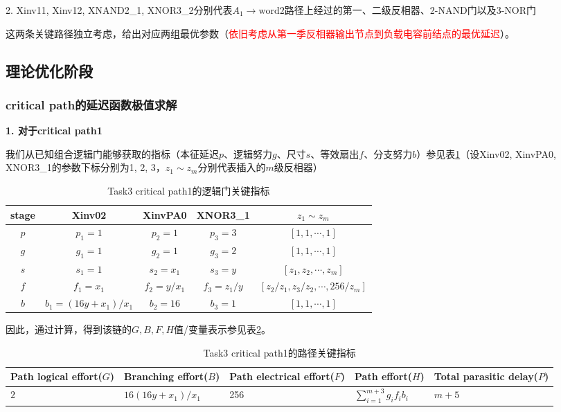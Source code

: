 \documentclass[UTF8,12pt,a4paper]{ctexart}
\begin{document}
2. Xinv11, Xinv12, XNAND2\_1, XNOR3\_2分别代表$A_1 \rightarrow \text{word2}$路径上经过的第一、二级反相器、2-NAND门以及3-NOR门

这两条关键路径独立考虑，给出对应两组最优参数（\textcolor{red}{依旧考虑从第一季反相器输出节点到负载电容前结点的最优延迟}）。

\subsection{理论优化阶段}

\subsubsection{critical path的延迟函数极值求解}

\textbf{1. 对于critical path1}

我们从已知组合逻辑门能够获取的指标（本征延迟$p$、逻辑努力$g$、尺寸$s$、等效扇出$f$、分支努力$b$）参见表\ref{tab:task3_p1_metrics}（设Xinv02, XinvPA0, XNOR3\_1的参数下标分别为1, 2, 3，$z_1 \sim z_m$分别代表插入的$m$级反相器）

\begin{table}[htbp]
    \centering
    \caption{Task3 critical path1的逻辑门关键指标}
    \label{tab:task3_p1_metrics}
    \begin{tabular}{ccccc}
    \toprule
    stage & Xinv02 & XinvPA0 & XNOR3\_1 & $z_1 \sim z_m$ \\
    \midrule
    $p$ & $p_1 = 1$ & $p_2 = 1$ & $p_3 = 3$ & $[1,1,\cdots ,1]$ \\
    $g$ & $g_1 = 1$ & $g_2 = 1$ & $g_3 = 2$ & $[1,1,\cdots ,1]$ \\
    $s$ & $s_1 = 1$ & $s_2 = x_1$ & $s_3 = y$ & $[z_1, z_2, \cdots, z_m]$ \\
    $f$ & $f_1 = x_1$ & $f_2 = y/x_1$ & $f_3 = z_{1}/y$ & $[z_{2}/z_{1}, z_{3}/z_{2}, \cdots, 256/z_{m}]$ \\
    $b$ & $b_1 = (16y+x_1)/x_1$ & $b_2 = 16$ & $b_3 = 1$ & $[1,1,\cdots ,1]$ \\
    \bottomrule
    \end{tabular}
\end{table}

因此，通过计算，得到该链的$G,B,F,H$值/变量表示参见表\ref{tab:task3_p1_path_metrics}。

\begin{table}[htbp]
    \centering
    \caption{Task3 critical path1的路径关键指标}
    \label{tab:task3_p1_path_metrics}
    \begin{tabularx}{\linewidth}{XXXXX}
    \toprule
    Path logical effort($G$) & Branching effort($B$) &
    Path electrical effort($F$) & Path effort($H$) &
    Total parasitic delay($P$) \\
    \midrule
    $2$ & $16(16y+x_1)/x_1$ & 256 & $\sum_{i=1}^{m+3}{g_i f_i b_i}$ & $m+5$ \\
    \bottomrule
    \end{tabularx}
\end{table}
\end{document}
